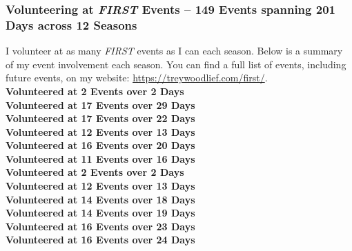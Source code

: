 \subsubsection*{Volunteering at \textit{FIRST} Events -- 149 Events spanning 201 Days across 12 Seasons}
I volunteer at as many \textit{FIRST} events as I can each season. Below is a summary of my event involvement each season.
You can find a full list of events, including future events, on my website: \url{https://treywoodlief.com/first/}.\\ 
 \textbf{Volunteered at 2 Events over 2 Days}\\ 
 \textbf{Volunteered at 17 Events over 29 Days}\\ 
 \textbf{Volunteered at 17 Events over 22 Days}\\ 
 \textbf{Volunteered at 12 Events over 13 Days}\\ 
 \textbf{Volunteered at 16 Events over 20 Days}\\ 
 \textbf{Volunteered at 11 Events over 16 Days}\\ 
 \textbf{Volunteered at 2 Events over 2 Days}\\ 
 \textbf{Volunteered at 12 Events over 13 Days}\\ 
 \textbf{Volunteered at 14 Events over 18 Days}\\ 
 \textbf{Volunteered at 14 Events over 19 Days}\\ 
 \textbf{Volunteered at 16 Events over 23 Days}\\ 
 \textbf{Volunteered at 16 Events over 24 Days}\\ 
